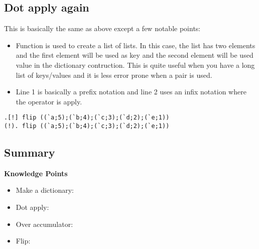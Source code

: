 \subsection{Dot apply again}
This is basically the same as above except a few notable points:
\begin{itemize}
\item Function  is used to create a list of lists. In this case, the list has two elements and the first element will be used as key and the second element will be used value in the dictionary contruction. This is quite useful when you have a long list of keys/values and it is less error prone when a pair is used.
\item Line 1 is basically a prefix notation  and line 2 uses an infix notation  where the operator  is  apply.
\end{itemize}
\begin{verbatim}
.[!] flip ((`a;5);(`b;4);(`c;3);(`d;2);(`e;1))
(!). flip ((`a;5);(`b;4);(`c;3);(`d;2);(`e;1))
\end{verbatim}


\subsection{Summary}

\begin{noteblock}
\textbf{Knowledge Points}
\begin{itemize}
\item Make a dictionary: \href{https://code.kx.com/q/ref/dict/#dict}{}
\item Dot apply: \href{https://code.kx.com/q/ref/apply/}{}
\item Over accumulator: \href{https://code.kx.com/q/ref/accumulators/#binary-values}{\q{/}}
\item Flip: \href{https://code.kx.com/q/ref/flip/}{}
\end{itemize}
\end{noteblock}

\clearpage
